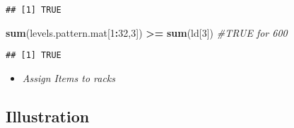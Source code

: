 \documentclass[
]{article}
\newenvironment{Shaded}{\begin{snugshade}}{\end{snugshade}}
\newcommand{\CommentTok}[1]{\textcolor[rgb]{0.56,0.35,0.01}{\textit{#1}}}
\newcommand{\DecValTok}[1]{\textcolor[rgb]{0.00,0.00,0.81}{#1}}
\newcommand{\KeywordTok}[1]{\textcolor[rgb]{0.13,0.29,0.53}{\textbf{#1}}}
\newcommand{\NormalTok}[1]{#1}
\newcommand{\OperatorTok}[1]{\textcolor[rgb]{0.81,0.36,0.00}{\textbf{#1}}}
\newcommand{\StringTok}[1]{\textcolor[rgb]{0.31,0.60,0.02}{#1}}
\providecommand{\tightlist}{%
  \setlength{\itemsep}{0pt}\setlength{\parskip}{0pt}}
\begin{document}
\begin{verbatim}
## [1] TRUE
\end{verbatim}

\begin{Shaded}
\begin{Highlighting}[]
\KeywordTok{sum}\NormalTok{(levels.pattern.mat[}\DecValTok{1}\OperatorTok{:}\DecValTok{32}\NormalTok{,}\DecValTok{3}\NormalTok{]) }\OperatorTok{>=}\StringTok{ }\KeywordTok{sum}\NormalTok{(ld[}\DecValTok{3}\NormalTok{]) }\CommentTok{#TRUE  for 600}
\end{Highlighting}
\end{Shaded}

\begin{verbatim}
## [1] TRUE
\end{verbatim}

\begin{itemize}
\tightlist
\item
  \emph{Assign Items to racks}
\end{itemize}

\hypertarget{illustration}{%
\subsection{Illustration}\label{illustration}}
\end{document}
